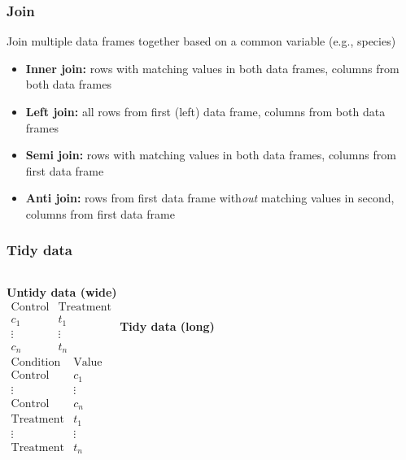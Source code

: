 \documentclass{beamer}\usepackage[]{graphicx}\usepackage[]{color}
\makeatletter
\newcommand{\hlopt}[1]{\textcolor[rgb]{0,0,0}{#1}}%
\newcommand{\hlstd}[1]{\textcolor[rgb]{0.345,0.345,0.345}{#1}}%
\newcommand{\hlkwd}[1]{\textcolor[rgb]{0.737,0.353,0.396}{\textbf{#1}}}%
\newenvironment{kframe}{%
 \def\at@end@of@kframe{}%
 \ifinner\ifhmode%
  \def\at@end@of@kframe{\end{minipage}}%
  \begin{minipage}{\columnwidth}%
 \fi\fi%
 \def\FrameCommand##1{\hskip\@totalleftmargin \hskip-\fboxsep
 \colorbox{shadecolor}{##1}\hskip-\fboxsep
     \hskip-\linewidth \hskip-\@totalleftmargin \hskip\columnwidth}%
 \MakeFramed {\advance\hsize-\width
   \@totalleftmargin\z@ \linewidth\hsize
   \@setminipage}}%
 {\par\unskip\endMakeFramed%
 \at@end@of@kframe}
\newenvironment{knitrout}{}{} %
\makeatother
\begin{document}
\begin{frame}
  \frametitle{Join}
  Join multiple data frames together based on a common variable (e.g., species)\\
  \pause
  \begin{itemize}
    \item \textbf{Inner join:} rows with matching values in both data frames, columns from both data frames
    \item \textbf{Left join:} all rows from first (left) data frame, columns from both data frames
    \item \textbf{Semi join:} rows with matching values in both data frames, columns from first data frame
    \item \textbf{Anti join:} rows from first data frame with\textit{out} matching values in second, columns from first data frame
  \end{itemize}
\end{frame}


\begin{frame}
  \frametitle{Tidy data}
  \begin{columns}[t]
  \column{.5\framewidth}
    \centering \textbf{Untidy data (wide)}\\
    \bigskip
    $\begin{array}{c|c}
      \text{Control} & \text{Treatment} \\
      \hline
        c_1 & t_1 \\
        \vdots & \vdots \\
        c_n & t_n
    \end{array}$
  \column{.5\framewidth}
    \centering \textbf{Tidy data (long)}\\
    \bigskip
    $\begin{array}{c|c}
      \text{Condition} & \text{Value} \\
      \hline
      \text{Control} & c_1 \\
      \vdots & \vdots \\
      \text{Control} & c_n \\
      \text{Treatment} & t_1 \\
      \vdots & \vdots \\
      \text{Treatment} & t_n
    \end{array}$
  \end{columns}
\end{frame}
\end{document}

